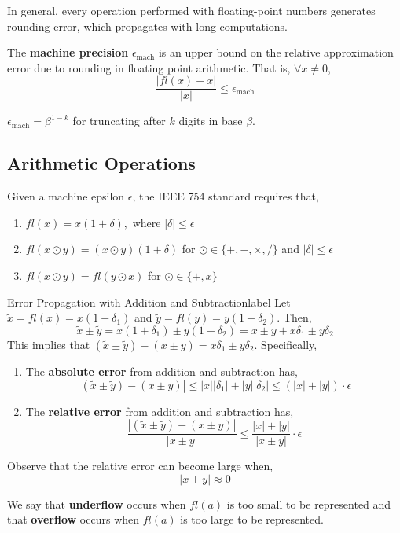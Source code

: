 \NewLine 

\noindent In general, every operation performed with floating-point numbers generates rounding error, which propagates with long computations.

\begin{defn}
    \sloppy The \textbf{machine precision} $\epsilon_{\operatorname{mach}}$ is an upper bound on the relative approximation error due to rounding in floating point arithmetic. That is, $\forall x \neq 0$,
    \[\frac{|f l(x)-x|}{|x|} \leq \epsilon_{\operatorname{mach}}\]
\end{defn}

\begin{cor}
    $\epsilon_{\text {mach}}=\beta^{1-k}$ for truncating after $k$ digits in base $\beta$.
\end{cor}

\subsection{Arithmetic Operations}
Given a machine epsilon $\epsilon$, the IEEE 754 standard requires that,
\begin{enumerate}
    \item $fl(x)=x(1+\delta), \text { where }|\delta| \leq \epsilon$
    \item $f l(x \odot y)=(x \odot y)(1+\delta)$ for $\odot \in \{+,-, \times, /\}$ and $|\delta| \leq \epsilon$
    \item $fl(x \odot y)=f l(y \odot x)$ for $\odot \in \{+, x\}$
\end{enumerate}

\begin{ex}{Error Propagation with Addition and Subtraction}{label}
    Let $\tilde{x}=f l(x)=x\left(1+\delta_1\right)$ and $\tilde{y}=f l(y)=y\left(1+\delta_2\right)$. Then,
    \[\tilde{x} \pm \tilde{y}=x\left(1+\delta_1\right) \pm y\left(1+\delta_2\right)=x \pm y+x \delta_1 \pm y \delta_2\]
    This implies that $(\tilde{x} \pm \tilde{y})-(x \pm y)=x \delta_1 \pm y \delta_2$. Specifically,
    
    \begin{enumerate}
        \item The \textbf{absolute error} from addition and subtraction has,
        \[|(\tilde{x} \pm \tilde{y})-(x \pm y)| \leq|x|\left|\delta_1\right|+|y|\left|\delta_2\right| \leq(|x|+|y|) \cdot \epsilon\]
        \item The \textbf{relative error} from addition and subtraction has,
        \[\frac{|(\tilde{x} \pm \tilde{y})-(x \pm y)|}{|x \pm y|} \leq \frac{|x|+|y|}{|x \pm y|} \cdot \epsilon\]
    \end{enumerate}
    Observe that the relative error can become large when,
    \[|x \pm y| \approx 0\]
\end{ex}

\begin{marginfigure}
    We say that \textbf{underflow} occurs when $fl(a)$ is too small to be represented and that \textbf{overflow} occurs when $fl(a)$ is too large to be represented.
\end{marginfigure}